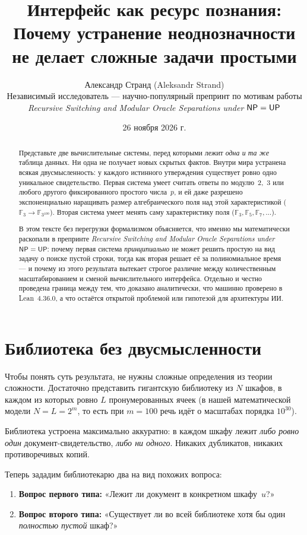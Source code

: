 \documentclass[11pt,a4paper]{article}
\title{\textbf{\Large Интерфейс как ресурс познания:\\[4pt]
\large Почему устранение неоднозначности не делает сложные задачи простыми}}
\author{Александр Странд (Aleksandr Strand)\\
\small Независимый исследователь --- научно-популярный препринт по мотивам работы\\
\small\emph{Recursive Switching and Modular Oracle Separations under $\NP = \UP$}}
\date{26 ноября 2026 г.}
\newcommand{\NP}{\mathsf{NP}}
\newcommand{\UP}{\mathsf{UP}}
\newcommand{\F}{\mathbb{F}}
\begin{document}
\maketitle

\begin{abstract}
Представьте две вычислительные системы, перед которыми лежит \emph{одна и та же} таблица данных. Ни одна не получает новых скрытых фактов. Внутри мира устранена всякая двусмысленность: у каждого истинного утверждения существует ровно одно уникальное свидетельство. Первая система умеет считать ответы по модулю~$2$,~$3$ или любого другого фиксированного простого числа~$p$, и ей даже разрешено экспоненциально наращивать размер алгебраического поля над этой характеристикой ($\F_3 \to \F_{3^{100}}$). Вторая система умеет менять саму характеристику поля ($\F_3, \F_5, \F_7, \dots$).

В этом тексте без перегрузки формализмом объясняется, что именно мы математически раскопали в препринте \emph{Recursive Switching and Modular Oracle Separations under $\NP = \UP$}: почему первая система \emph{принципиально} не может решить простую на вид задачу о поиске пустой строки, тогда как вторая решает её за полиномиальное время — и почему из этого результата вытекает строгое различие между количественным масштабированием и сменой вычислительного интерфейса. Отдельно и честно проведена граница между тем, что доказано аналитически, что машинно проверено в Lean~4.36.0, а что остаётся открытой проблемой или гипотезой для архитектуры ИИ.
\end{abstract}

\section{Библиотека без двусмысленности}

Чтобы понять суть результата, не нужны сложные определения из теории сложности. Достаточно представить гигантскую библиотеку из $N$ шкафов, в каждом из которых ровно $L$ пронумерованных ячеек (в нашей математической модели $N = L = 2^m$, то есть при $m = 100$ речь идёт о масштабах порядка $10^{30}$).

Библиотека устроена максимально аккуратно: в каждом шкафу лежит \emph{либо ровно один} документ-свидетельство, \emph{либо ни одного}. Никаких дубликатов, никаких противоречивых копий.

Теперь зададим библиотекарю два на вид похожих вопроса:
\begin{enumerate}
  \item \textbf{Вопрос первого типа:} «Лежит ли документ в конкретном шкафу~$u$?»
  \item \textbf{Вопрос второго типа:} «Существует ли во всей библиотеке хотя бы один \emph{полностью пустой} шкаф?»
\end{enumerate}
\end{document}
